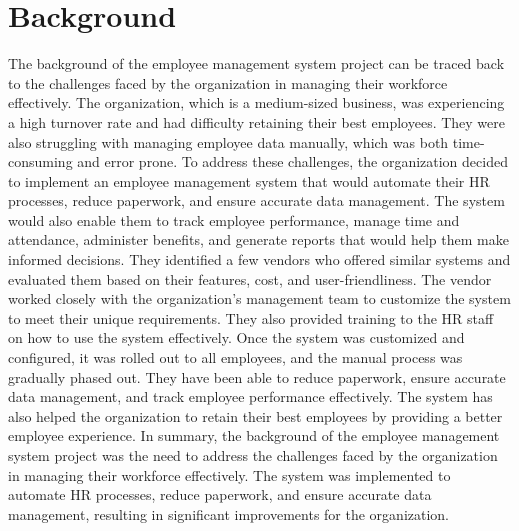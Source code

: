 \documentclass{article}
\begin{document}
\section{Background}
The background of the employee management system project can be
traced back to the challenges faced by the organization in managing their
workforce effectively. The organization, which is a medium-sized
business, was experiencing a high turnover rate and had difficulty
retaining their best employees. They were also struggling with managing
employee data manually, which was both time-consuming and error
prone. To address these challenges, the organization decided to
implement an employee management system that would automate their
HR processes, reduce paperwork, and ensure accurate data
management. The system would also enable them to track employee
performance, manage time and attendance, administer benefits, and
generate reports that would help them make informed decisions. They
identified a few vendors who offered similar systems and evaluated
them based on their features, cost, and user-friendliness. The vendor 
worked closely with the organization's management team to customize
the system to meet their unique requirements. They also provided
training to the HR staff on how to use the system effectively. Once the
system was customized and configured, it was rolled out to all
employees, and the manual process was gradually phased out. They have
been able to reduce paperwork, ensure accurate data management, and
track employee performance effectively. The system has also helped the
organization to retain their best employees by providing a better
employee experience. In summary, the background of the employee
management system project was the need to address the challenges
faced by the organization in managing their workforce effectively. The
system was implemented to automate HR processes, reduce paperwork,
and ensure accurate data management, resulting in significant
improvements for the organization.
\end{document}
